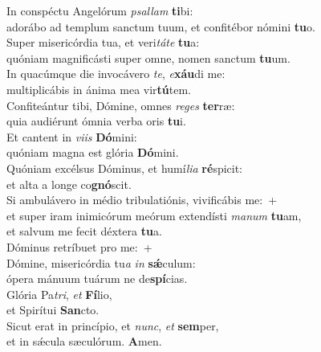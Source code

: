 \evenverse In conspéctu Angelórum \textit{psal}\textit{lam} \textbf{ti}bi:~\*\\
\evenverse adorábo ad templum sanctum tuum, et confitébor nómini \textbf{tu}o.\\
\oddverse Super misericórdia tua, et veri\textit{tá}\textit{te} \textbf{tu}a:~\*\\
\oddverse quóniam magnificásti super omne, nomen sanctum \textbf{tu}um.\\
\evenverse In quacúmque die invocávero \textit{te}, \textit{e}\textbf{xáu}di me:~\*\\
\evenverse multiplicábis in ánima mea vir\textbf{tú}tem.\\
\oddverse Confiteántur tibi, Dómine, omnes \textit{re}\textit{ges} \textbf{ter}ræ:~\*\\
\oddverse quia audiérunt ómnia verba oris \textbf{tu}i.\\
\evenverse Et cantent in \textit{vi}\textit{is} \textbf{Dó}mini:~\*\\
\evenverse quóniam magna est glória \textbf{Dó}mini.\\
\oddverse Quóniam excélsus Dóminus, et humí\textit{li}\textit{a} \textbf{ré}spicit:~\*\\
\oddverse et alta a longe co\textbf{gnó}scit.\\
\evenverse Si ambulávero in médio tribulatiónis, vivificábis me:~+\\
\evenverse  et super iram inimicórum meórum extendísti \textit{ma}\textit{num} \textbf{tu}am,~\*\\
\evenverse et salvum me fecit déxtera \textbf{tu}a.\\
\oddverse Dóminus retríbuet pro me:~+\\
\oddverse  Dómine, misericórdia tu\textit{a} \textit{in} \textbf{sǽ}culum:~\*\\
\oddverse ópera mánuum tuárum ne de\textbf{spí}cias.\\
\evenverse Glória Pa\textit{tri}, \textit{et} \textbf{Fí}lio,~\*\\
\evenverse et Spirítui \textbf{San}cto.\\
\oddverse Sicut erat in princípio, et \textit{nunc}, \textit{et} \textbf{sem}per,~\*\\
\oddverse et in sǽcula sæculórum. \textbf{A}men.\\
